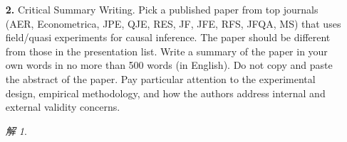 \documentclass[a4paper]{ctexart}
\theoremstyle{remark}
\newtheorem*{solution}{解}
\begin{document}
\begin{itemize}
    \item [\textbf{2.}]Critical Summary Writing. Pick a published paper from top journals (AER, Econometrica, JPE, QJE, RES, JF, JFE, RFS, JFQA, MS) that uses field/quasi experiments for causal inference. The paper should be different from those in the presentation list. Write a summary of the paper in your own words in no more than 500 words (in English). Do not copy and paste the abstract of the paper. Pay particular attention to the experimental design, empirical methodology, and how the authors address internal and external validity concerns.
    
    \begin{solution}
        
    \end{solution}

    \iffalse
    \fi


\end{itemize}
\end{document}
